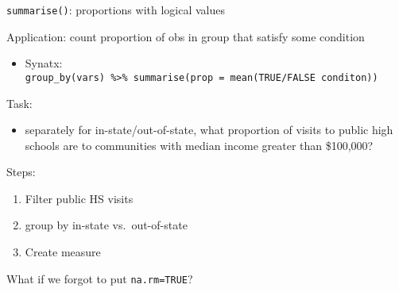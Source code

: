 \documentclass[8pt,ignorenonframetext,dvipsnames]{beamer}
\newenvironment{Shaded}{\begin{snugshade}}{\end{snugshade}}
\newcommand{\KeywordTok}[1]{\textcolor[rgb]{0.13,0.29,0.53}{\textbf{#1}}}
\newcommand{\DataTypeTok}[1]{\textcolor[rgb]{0.13,0.29,0.53}{#1}}
\newcommand{\DecValTok}[1]{\textcolor[rgb]{0.00,0.00,0.81}{#1}}
\newcommand{\StringTok}[1]{\textcolor[rgb]{0.31,0.60,0.02}{#1}}
\newcommand{\CommentTok}[1]{\textcolor[rgb]{0.56,0.35,0.01}{\textit{#1}}}
\newcommand{\OtherTok}[1]{\textcolor[rgb]{0.56,0.35,0.01}{#1}}
\newcommand{\OperatorTok}[1]{\textcolor[rgb]{0.81,0.36,0.00}{\textbf{#1}}}
\newcommand{\NormalTok}[1]{#1}
\providecommand{\tightlist}{%
  \setlength{\itemsep}{0pt}\setlength{\parskip}{0pt}}
\renewcommand{\textbf}[1]{{\color{darkgray}\bfseries\fontfamily{Montserrat-TOsF}#1}}
\begin{document}
\begin{frame}[fragile]{\texttt{summarise()}: proportions with logical
values}

Application: count proportion of obs in group that satisfy some
condition

\begin{itemize}
\tightlist
\item
  Synatx:
  \texttt{group\_by(vars)\ \%\textgreater{}\%\ summarise(prop\ =\ mean(TRUE/FALSE\ conditon))}
\end{itemize}

Task:

\begin{itemize}
\tightlist
\item
  separately for in-state/out-of-state, what proportion of visits to
  public high schools are to communities with median income greater than
  \$100,000?
\end{itemize}

Steps:

\begin{enumerate}
\def\labelenumi{\arabic{enumi}.}
\tightlist
\item
  Filter public HS visits
\item
  group by in-state vs.~out-of-state
\item
  Create measure
\end{enumerate}

\begin{Shaded}
\end{Shaded}

What if we forgot to put \texttt{na.rm=TRUE}?

\end{frame}
\end{document}
